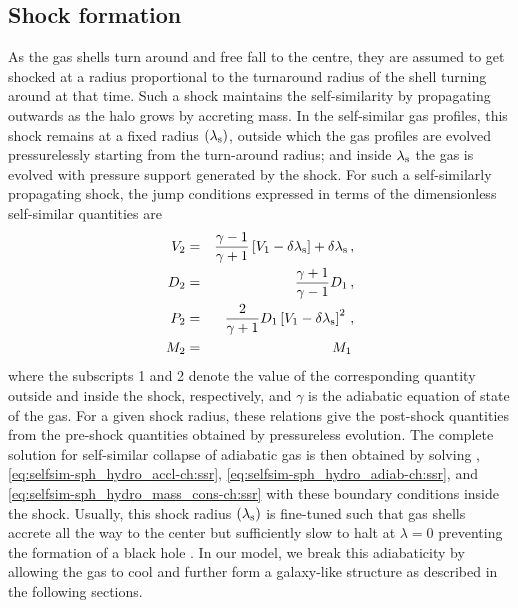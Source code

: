 \subsection{Shock formation}%
As the gas shells turn around and free fall to the centre, they are assumed to get shocked at a radius proportional to the turnaround radius of the shell turning around at that time. Such a shock maintains the self-similarity by 
propagating outwards as the halo grows by accreting mass.
In the self-similar gas profiles, this shock remains at a fixed radius $(\lambda_{\rm s})$, outside which the gas profiles are evolved pressurelessly starting from the turn-around radius;
and inside $\lambda_{\rm s}$ the gas is evolved with pressure support generated by the shock.
For such a self-similarly propagating shock, the jump conditions \cite{1985Bertschinger} expressed in terms of the dimensionless self-similar quantities are 
\begin{eqnarray}
\label{eq:shock_jump_selfsim-ch:ssr}
V_2 &=& \frac{\gamma -1}{\gamma +1} \left[ V_1-\delta \lambda _{\rm s} \right] + \delta \lambda _{\rm s} \,,\nonumber\\
D_2 &=& \frac{\gamma +1}{\gamma -1} D_1 \,,\nonumber\\
P_2 &=& \frac{2}{\gamma +1} D_1 \left[ V_1-\delta \lambda _{\rm s} \right]^2 \,,\nonumber\\
M_2 &=& M_1 \,
\end{eqnarray}
where the subscripts 1 and 2 denote the value of the corresponding quantity outside and inside the shock, respectively, and $\gamma$ is the adiabatic equation of state of the gas. %
For a given shock radius, these relations give the post-shock quantities from the pre-shock quantities obtained by pressureless evolution. 
The complete solution for self-similar collapse of adiabatic gas is then obtained by solving , \eqref{eq:selfsim-sph_hydro_accl-ch:ssr}, \eqref{eq:selfsim-sph_hydro_adiab-ch:ssr}, and \eqref{eq:selfsim-sph_hydro_mass_cons-ch:ssr} with these boundary conditions inside the shock.
Usually, this shock radius $(\lambda_{\rm s})$ is fine-tuned such that gas shells accrete all the way to the center but sufficiently slow to halt at $\lambda=0$ preventing the formation of a black hole \cite{1985Bertschinger}. In our model, we break this adiabaticity by allowing the gas to cool and further form a galaxy-like structure as described in the following sections.










